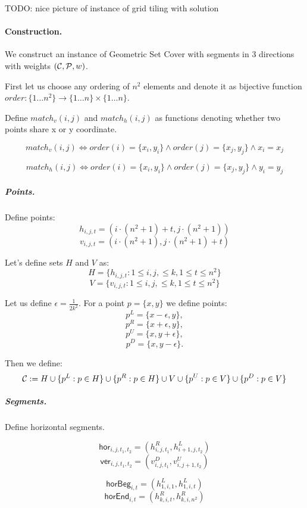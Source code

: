 TODO: nice picture of instance of grid tiling with solution

\paragraph{Construction.}
We construct an instance of Geometric Set Cover with segments in 3 directions
with weights $(\mathcal{C}, \mathcal{P}, w)$.

First let us choose any ordering of $n^2$ elements
and denote it as bijective function
$order : \{1 \ldots n^2\} \rightarrow \{1 \ldots n\} \times \{1 \ldots n\}$.

Define $match_v(i, j)$ and $match_h(i, j)$
as functions denoting whether two points share x or y coordinate.

$$match_v(i, j) \iff
order(i) = \{x_i, y_i\} \land order(j) = \{x_j, y_j\} \land x_i = x_j$$

$$match_h(i, j) \iff
order(i) = \{x_i, y_i\} \land order(j) = \{x_j, y_j\} \land y_i = y_j$$


\subparagraph{Points.}

Define points:
	$$h_{i, j, t} = (i \cdot (n^2+1) + t, j \cdot (n^2+1))$$
	$$v_{i, j, t} = (i \cdot (n^2+1), j \cdot (n^2+1) + t)$$
	
Let's define sets $H$ and $V$ as:
$$H = \{h_{i, j, t} : 1 \le i, j, \le k, 1 \le t \le n^2\}$$
$$V = \{v_{i, j, t} : 1 \le i, j, \le k, 1 \le t \le n^2\}$$
	
Let us define $\epsilon = \frac{1}{2k^2}$.
For a point $p = \{x, y\}$ we define points:
$$p^{L} = \{x - \epsilon, y\},$$
$$p^{R} = \{x + \epsilon, y\},$$
$$p^{U} = \{x, y + \epsilon\},$$
$$p^{D} = \{x, y - \epsilon\}.$$

Then we define:
$$\mathcal{C} := H \cup \{p^L : p \in H\} \cup \{p^R : p \in H\}
\cup V \cup \{p^U : p \in V\} \cup \{p^D : p \in V\} $$


\subparagraph{Segments.}
Define horizontal segments.

\newcommand{\hor}[4]{\mathsf{hor}_{#1,#2,#3,#4}}
\newcommand{\ver}[4]{\mathsf{ver}_{#1,#2,#3,#4}}
\newcommand{\horbeg}[2]{\mathsf{horBeg}_{#1,#2}}
\newcommand{\verbeg}[2]{\mathsf{verBeg}_{#1,#2}}
\newcommand{\horend}[2]{\mathsf{horEnd}_{#1,#2}}
\newcommand{\verend}[2]{\mathsf{verEnd}_{#1,#2}}

$$\hor{i}{j}{t_1}{t_2} = (h^R_{i,j,t_1}, h^L_{i+1, j, t_2})$$
$$\ver{i}{j}{t_1}{t_2} = (v^D_{i,j,t_1}, v^U_{i, j+1, t_2})$$

$$\horbeg{i}{t} = (h^L_{1, i, 1}, h^L_{1, i, t})$$
$$\horend{i}{t} = (h^R_{k, i, t}, h^R_{k, i, n^2})$$

